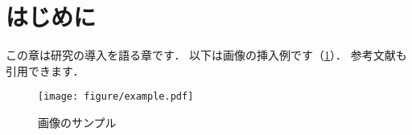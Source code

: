 \section{はじめに}\label{sec:introduction}
この章は研究の導入を語る章です．
以下は画像の挿入例です（\ref{fig:example}）．
参考文献も引用できます\cite{Yamamoto2018}．

\begin{figure}
  \centering
  \texttt{[image: figure/example.pdf]}
  \caption{画像のサンプル}
  \label{fig:example}
\end{figure}
